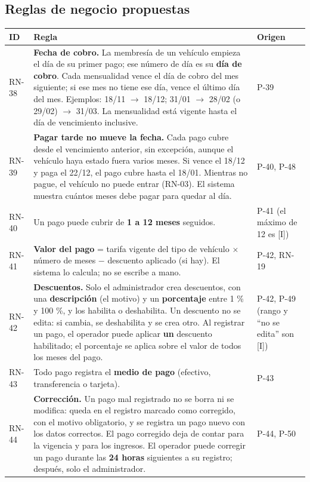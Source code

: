 \subsection{Reglas de negocio propuestas}

\begin{longtable}{>{\raggedright\arraybackslash}p{1.5cm}>{\raggedright\arraybackslash}p{11.4cm}>{\raggedright\arraybackslash}p{1.5cm}}
\toprule
\textbf{ID} & \textbf{Regla} & \textbf{Origen}\\
\midrule\endhead
RN-38 & \textbf{Fecha de cobro.} La membresía de un vehículo empieza el día de su primer pago; ese número de día es su \textbf{día de cobro}. Cada mensualidad vence el día de cobro del mes siguiente; si ese mes no tiene ese día, vence el último día del mes. Ejemplos: 18/11 $\rightarrow$ 18/12; 31/01 $\rightarrow$ 28/02 (o 29/02) $\rightarrow$ 31/03. La mensualidad está vigente hasta el día de vencimiento inclusive. & [U] P-39\\
RN-39 & \textbf{Pagar tarde no mueve la fecha.} Cada pago cubre desde el vencimiento anterior, sin excepción, aunque el vehículo haya estado fuera varios meses. Si vence el 18/12 y paga el 22/12, el pago cubre hasta el 18/01. Mientras no pague, el vehículo no puede entrar (RN-03). El sistema muestra cuántos meses debe pagar para quedar al día. & [U] P-40, P-48\\
RN-40 & Un pago puede cubrir de \textbf{1 a 12 meses} seguidos. & [U] P-41 (el máximo de 12 es [I])\\
RN-41 & \textbf{Valor del pago} = tarifa vigente del tipo de vehículo $\times$ número de meses $-$ descuento aplicado (si hay). El sistema lo calcula; no se escribe a mano. & [U] P-42, RN-19\\
RN-42 & \textbf{Descuentos.} Solo el administrador crea descuentos, con una \textbf{descripción} (el motivo) y un \textbf{porcentaje} entre 1 \% y 100 \%, y los habilita o deshabilita. Un descuento no se edita: si cambia, se deshabilita y se crea otro. Al registrar un pago, el operador puede aplicar \textbf{un} descuento habilitado; el porcentaje se aplica sobre el valor de todos los meses del pago. & [U] P-42, P-49 (rango y ``no se edita'' son [I])\\
RN-43 & Todo pago registra el \textbf{medio de pago} (efectivo, transferencia o tarjeta). & [U] P-43\\
RN-44 & \textbf{Corrección.} Un pago mal registrado no se borra ni se modifica: queda en el registro marcado como corregido, con el motivo obligatorio, y se registra un pago nuevo con los datos correctos. El pago corregido deja de contar para la vigencia y para los ingresos. El operador puede corregir un pago durante las \textbf{24 horas} siguientes a su registro; después, solo el administrador. & [U] P-44, P-50\\

\end{longtable}
